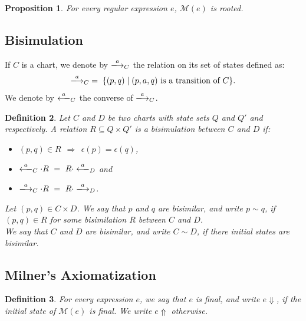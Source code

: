 \documentclass{article}
\newtheorem{definition}{Definition}[section]
\newtheorem{proposition}[definition]{Proposition}
\newcommand{\milner}[1]{\mathcal{M}(#1)}
\begin{document}
\begin{proposition}
For every regular expression $e$, $\milner{e}$ is rooted.
\end{proposition}

\subsection{Bisimulation}
\begin{notation}
    If $C$ is a chart, we denote by $\xlongrightarrow{a}_{C}$ the relation on its set of states defined as:
    $$\xlongrightarrow{a}_{C} \;=\; \{ (p,q) \mid (p,a,q) \text{ is a transition of } C \}.$$
    We denote by $\xlongleftarrow{a}_{C}$ the converse of $\xlongrightarrow{a}_{C}$.
\end{notation}

\begin{definition}
Let $C$ and $D$ be two charts with state sets $Q$ and $Q'$ and respectively. A relation $R\subseteq Q\times Q'$ is a \emph{bisimulation} between $C$ and $D$ if:
\begin{itemize}
    \item $(p,q)\in R \ \ \Rightarrow\ \ \epsilon(p)=\epsilon(q)$, 
    \item $\xlongleftarrow{a}_{C}\cdot R\ =\ R \cdot \xlongleftarrow{a}_{D}$ and
    \item $\xlongrightarrow{a}_{C} \cdot R\ =\ R \cdot \xlongrightarrow{a}_{D}$.
\end{itemize}

Let $(p,q)\in C\times D$. We say that $p$ and $q$ are \emph{bisimilar}, and write $p\sim q$, if $(p,q)\in R$ for some bisimilation $R$ between $C$  and $D$.\\

We say that $C$ and $D$ are \emph{bisimilar}, and write $C \sim D$, if there initial states are bisimilar.
\end{definition}

\subsection{Milner's Axiomatization}


\begin{definition} For every expression $e$, we say that $e$ is \emph{final}, and write $e\Downarrow$, if the initial state of $\milner{e}$ is final. We write $e\Uparrow$ otherwise.
    \end{definition}
\end{document}

